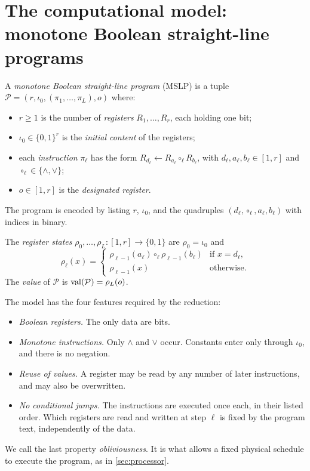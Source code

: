 \section{The computational model: monotone Boolean straight-line programs}\label{sec:model}

\begin{definition}\label{def:mslp}
A \emph{monotone Boolean straight-line program} (MSLP) is a tuple
$\mathcal P=(r,\iota_0,(\pi_1,\dots,\pi_L),o)$ where:
\begin{itemize}
\item $r\ge 1$ is the number of \emph{registers} $R_1,\dots,R_r$, each holding one bit;
\item $\iota_0\in\{0,1\}^r$ is the \emph{initial content} of the registers;
\item each \emph{instruction} $\pi_\ell$ has the form
  $R_{d_\ell}\leftarrow R_{a_\ell}\circ_\ell R_{b_\ell}$, with $d_\ell,a_\ell,b_\ell\in[1,r]$ and
  $\circ_\ell\in\{\wedge,\vee\}$;
\item $o\in[1,r]$ is the \emph{designated register}.
\end{itemize}
The program is encoded by listing $r$, $\iota_0$, and the quadruples $(d_\ell,\circ_\ell,a_\ell,b_\ell)$
with indices in binary.
\end{definition}

\begin{definition}[Semantics]\label{def:semantics}
The \emph{register states} $\rho_0,\dots,\rho_L:[1,r]\to\{0,1\}$ are $\rho_0=\iota_0$ and
\[
\rho_\ell(x)=\begin{cases}\rho_{\ell-1}(a_\ell)\circ_\ell\rho_{\ell-1}(b_\ell)&\text{if }x=d_\ell,\\
\rho_{\ell-1}(x)&\text{otherwise.}\end{cases}
\]
The \emph{value} of $\mathcal P$ is $\operatorname{val}(\mathcal P)=\rho_L(o)$.
\end{definition}

The model has the four features required by the reduction:
\begin{itemize}
\item \emph{Boolean registers.} The only data are bits.
\item \emph{Monotone instructions.} Only $\wedge$ and $\vee$ occur. Constants enter only through
  $\iota_0$, and there is no negation.
\item \emph{Reuse of values.} A register may be read by any number of later instructions, and may
  also be overwritten.
\item \emph{No conditional jumps.} The instructions are executed once each, in their listed order.
  Which registers are read and written at step $\ell$ is fixed by the program text, independently of
  the data.
\end{itemize}
We call the last property \emph{obliviousness}. It is what allows a fixed physical schedule to
execute the program, as in \cref{sec:processor}.

